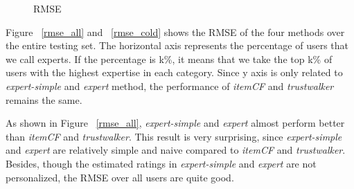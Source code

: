 \documentclass[12pt]{article}
\begin{document}
\begin{figure}[h]
	\centering
	
	\caption{RMSE}

\end{figure}

Figure ~\ref{rmse_all} and ~\ref{rmse_cold} shows the RMSE of the four methods over the entire testing set. The horizontal axis represents the percentage of users that we call experts. If the percentage is k\%, it means that we take the top k\% of users with the highest expertise in each category. Since y axis is only related to \emph{expert-simple} and \emph{expert} method, the performance of \emph{itemCF} and \emph{trustwalker} remains the same. 

As shown in Figure ~\ref{rmse_all}, \emph{expert-simple} and \emph{expert} almost perform better than \emph{itemCF} and \emph{trustwalker}. This result is very surprising, since \emph{expert-simple} and \emph{expert} are relatively simple and naive compared to \emph{itemCF} and \emph{trustwalker}. Besides, though the estimated ratings in \emph{expert-simple} and \emph{expert} are not personalized, the RMSE over all users are quite good. 
\end{document}
